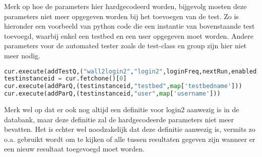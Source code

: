 \npar
Merk op hoe de parameters hier hardgecodeerd worden, bijgevolg moeten deze parameters niet meer opgegeven worden bij het toevoegen van de test. Zo is hieronder een voorbeeld van python code die een instantie van bovenstaande test toevoegd, waarbij enkel een testbed en een user opgegeven moet worden. Andere parameters voor de automated tester zoals de test-class en group zijn hier niet meer nodig.
\begin{lstlisting}[language=Python]
cur.execute(addTestQ,("wall2login2","login2",loginFreq,nextRun,enabled))
testinstanceid = cur.fetchone()[0]
cur.execute(addParQ,(testinstanceid,"testbed",map['testbedname']))	
cur.execute(addParQ,(testinstanceid,"user",map['username']))
\end{lstlisting}
\npar
Merk wel op dat er ook nog altijd een definitie voor login2 aanwezig is in de databank, maar deze definitie zal de hardgecodeerde parameters niet meer bevatten. Het is echter wel noodzakelijk dat deze definitie aanwezig is, vermits zo o.a. gebruikt wordt om te kijken of alle tussen resultaten gegeven zijn wanneer er een nieuw resultaat toegevoegd moet worden.

\clearpage
